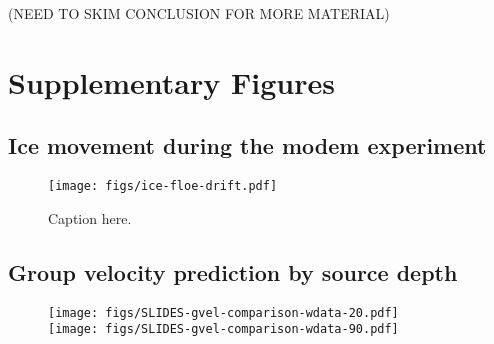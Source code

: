 (NEED TO SKIM CONCLUSION FOR MORE MATERIAL)

\FloatBarrier
\section*{Supplementary Figures}

\clearpage
\subsection*{Ice movement during the modem experiment}
\begin{figure}[h!]
\texttt{[image: figs/ice-floe-drift.pdf]}
\caption{\label{fig:iceFloeDrift}{Caption here.}}
\end{figure}

\clearpage
\FloatBarrier
\subsection*{Group velocity prediction by source depth}
\begin{figure}[h!]
\texttt{[image: figs/SLIDES-gvel-comparison-wdata-20.pdf]} \\
\texttt{[image: figs/SLIDES-gvel-comparison-wdata-90.pdf]}
\end{figure}













